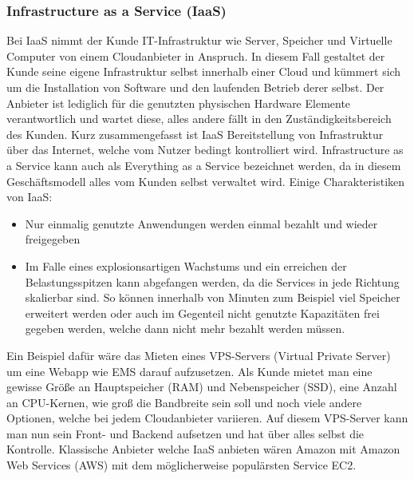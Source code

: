 
\subsubsection{Infrastructure as  a Service (IaaS)}
Bei IaaS nimmt der Kunde IT-Infrastruktur wie Server, Speicher und Virtuelle Computer von einem Cloudanbieter in Anspruch. In diesem Fall gestaltet der Kunde seine eigene Infrastruktur selbst innerhalb einer Cloud und kümmert sich um die Installation von Software und den laufenden Betrieb derer selbst. Der Anbieter ist lediglich für die genutzten physischen Hardware Elemente verantwortlich und wartet diese, alles andere fällt in den Zuständigkeitsbereich des Kunden. Kurz zusammengefasst ist IaaS Bereitstellung von Infrastruktur über das Internet, welche vom Nutzer bedingt kontrolliert wird. \newline
Infrastructure as a Service kann auch als Everything as a Service bezeichnet werden, da in diesem Geschäftsmodell alles vom Kunden selbst verwaltet wird. Einige Charakteristiken von IaaS:
\begin{itemize}
	\item Nur einmalig genutzte Anwendungen werden einmal bezahlt und wieder freigegeben
	\item Im Falle eines explosionsartigen Wachstums und ein erreichen der Belastungsspitzen kann abgefangen werden, da die Services in jede Richtung skalierbar sind. So können innerhalb von Minuten zum Beispiel viel Speicher erweitert werden oder auch im Gegenteil nicht genutzte Kapazitäten frei gegeben werden, welche dann nicht mehr bezahlt werden müssen.
\end{itemize}

Ein Beispiel dafür wäre das Mieten eines VPS-Servers (Virtual Private Server) um eine Webapp wie EMS darauf aufzusetzen.
Als Kunde mietet man eine gewisse Größe an Hauptspeicher (RAM) und Nebenspeicher (SSD), eine Anzahl an CPU-Kernen, wie groß die Bandbreite sein soll und noch viele andere Optionen, welche bei jedem Cloudanbieter variieren. Auf diesem VPS-Server kann man nun sein Front- und Backend aufsetzen und hat über alles selbst die Kontrolle. Klassische Anbieter welche IaaS anbieten wären Amazon mit Amazon Web Services (AWS) mit dem möglicherweise populärsten Service EC2.

